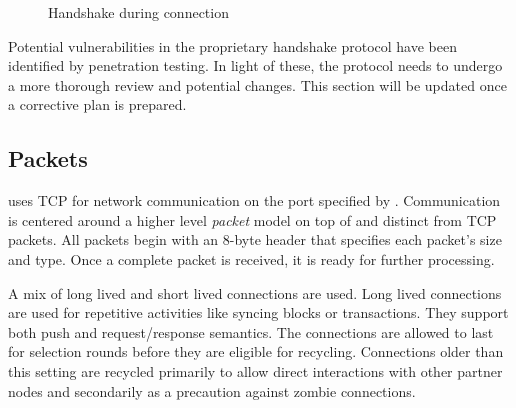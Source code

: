 \begin{figure}[H]
\begin{center}
		\caption{Handshake during connection\label{fig:network:handshake}}
	\end{center}
\end{figure}

Potential vulnerabilities in the \codenamespace proprietary handshake protocol have been identified by penetration testing.
In light of these, the protocol needs to undergo a more thorough review and potential changes.
This section will be updated once a corrective plan is prepared.

\subsection{Packets}

\codenamespace uses TCP for network communication on the port specified by .
Communication is centered around a higher level \emph{packet} model on top of and distinct from TCP packets.
All packets begin with an 8-byte header that specifies each packet's size and type.
Once a complete packet is received, it is ready for further processing.

\begin{figure}[H]
\end{figure}

A mix of long lived and short lived connections are used.
Long lived connections are used for repetitive activities like syncing blocks or transactions.
They support both push and request/response semantics.
The connections are allowed to last for  selection rounds  before they are eligible for recycling.
Connections older than this setting are recycled primarily to allow direct interactions with other partner nodes and secondarily as a precaution against zombie connections.

